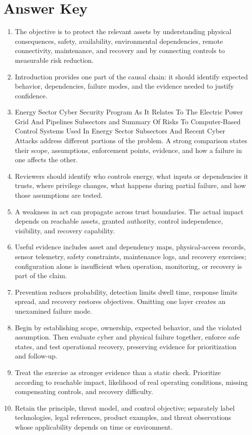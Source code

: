 \documentclass[11pt,letterpaper]{article}
\begin{document}
\section*{Answer Key}
\begin{enumerate}
\item The objective is to protect the relevant assets by understanding physical consequences, safety, availability, environmental dependencies, remote connectivity, maintenance, and recovery and by connecting controls to measurable risk reduction.
\item Introduction provides one part of the causal chain: it should identify expected behavior, dependencies, failure modes, and the evidence needed to justify confidence.
\item Energy Sector Cyber Security Program As It Relates To The Electric Power Grid And Pipelines Subsectors and Summary Of Risks To Computer-Based Control Systems Used In Energy Sector Subsectors And Recent Cyber Attacks address different portions of the problem. A strong comparison states their scope, assumptions, enforcement points, evidence, and how a failure in one affects the other.
\item Reviewers should identify who controls energy, what inputs or dependencies it trusts, where privilege changes, what happens during partial failure, and how those assumptions are tested.
\item A weakness in act can propagate across trust boundaries. The actual impact depends on reachable assets, granted authority, control independence, visibility, and recovery capability.
\item Useful evidence includes asset and dependency maps, physical-access records, sensor telemetry, safety constraints, maintenance logs, and recovery exercises; configuration alone is insufficient when operation, monitoring, or recovery is part of the claim.
\item Prevention reduces probability, detection limits dwell time, response limits spread, and recovery restores objectives. Omitting one layer creates an unexamined failure mode.
\item Begin by establishing scope, ownership, expected behavior, and the violated assumption. Then evaluate cyber and physical failure together, enforce safe states, and test operational recovery, preserving evidence for prioritization and follow-up.
\item Treat the exercise as stronger evidence than a static check. Prioritize according to reachable impact, likelihood of real operating conditions, missing compensating controls, and recovery difficulty.
\item Retain the principle, threat model, and control objective; separately label technologies, legal references, product examples, and threat observations whose applicability depends on time or environment.
\end{enumerate}
\end{document}
